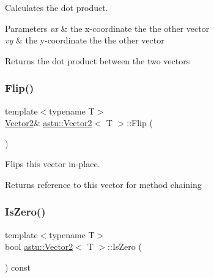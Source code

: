 Calculates the dot product.


\begin{DoxyParams}{Parameters}
{\em vx} & the x-\/coordinate the the other vector \\
\hline
{\em vy} & the y-\/coordinate the the other vector \\
\hline
\end{DoxyParams}
\begin{DoxyReturn}{Returns}
the dot product between the two vectors 
\end{DoxyReturn}
\mbox{\label{classastu_1_1Vector2_ae158630c2e79eedbaa827967c57be805}} 
\subsubsection{\texorpdfstring{Flip()}{Flip()}}
{\footnotesize\ttfamily template$<$typename T$>$ \\
\hyperlink{classastu_1_1Vector2}{Vector2}\& \hyperlink{classastu_1_1Vector2}{astu\+::\+Vector2}$<$ T $>$\+::Flip (\begin{DoxyParamCaption}{ }\end{DoxyParamCaption})\hspace{0.3cm}{\ttfamily [inline]}}

Flips this vector in-\/place.

\begin{DoxyReturn}{Returns}
reference to this vector for method chaining 
\end{DoxyReturn}
\mbox{\label{classastu_1_1Vector2_a3834ea419b358f4db9df5dc9afe584f6}} 
\subsubsection{\texorpdfstring{Is\+Zero()}{IsZero()}}
{\footnotesize\ttfamily template$<$typename T$>$ \\
bool \hyperlink{classastu_1_1Vector2}{astu\+::\+Vector2}$<$ T $>$\+::Is\+Zero (\begin{DoxyParamCaption}{ }\end{DoxyParamCaption}) const\hspace{0.3cm}{\ttfamily [inline]}}

